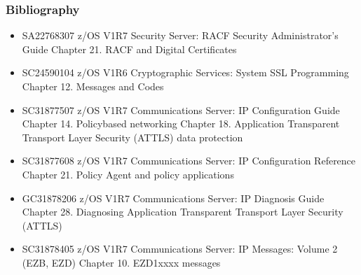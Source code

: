 \documentclass[letterpaper,10pt,english]{sphinxmanual}
\begin{document}
\subsubsection{Bibliography}
\label{\detokenize{Customization:bibliography}}\begin{itemize}
\item {} 
\sphinxAtStartPar
SA22\sphinxhyphen{}7683\sphinxhyphen{}07 z/OS V1R7 Security Server: RACF Security Administrator’s Guide Chapter 21. RACF and Digital Certificates

\item {} 
\sphinxAtStartPar
SC24\sphinxhyphen{}5901\sphinxhyphen{}04 z/OS V1R6 Cryptographic Services: System SSL Programming Chapter 12. Messages and Codes

\item {} 
\sphinxAtStartPar
SC31\sphinxhyphen{}8775\sphinxhyphen{}07 z/OS V1R7 Communications Server: IP Configuration Guide Chapter 14. Policy\sphinxhyphen{}based networking Chapter 18. Application Transparent Transport Layer Security (AT\sphinxhyphen{}TLS) data protection

\item {} 
\sphinxAtStartPar
SC31\sphinxhyphen{}8776\sphinxhyphen{}08 z/OS V1R7 Communications Server: IP Configuration Reference Chapter 21. Policy Agent and policy applications

\item {} 
\sphinxAtStartPar
GC31\sphinxhyphen{}8782\sphinxhyphen{}06 z/OS V1R7 Communications Server: IP Diagnosis Guide Chapter 28. Diagnosing Application Transparent Transport Layer Security (AT\sphinxhyphen{}TLS)

\item {} 
\sphinxAtStartPar
SC31\sphinxhyphen{}8784\sphinxhyphen{}05 z/OS V1R7 Communications Server: IP Messages: Volume 2 (EZB, EZD) Chapter 10. EZD1xxxx messages

\end{itemize}

\ignorespaces 
\end{document}
